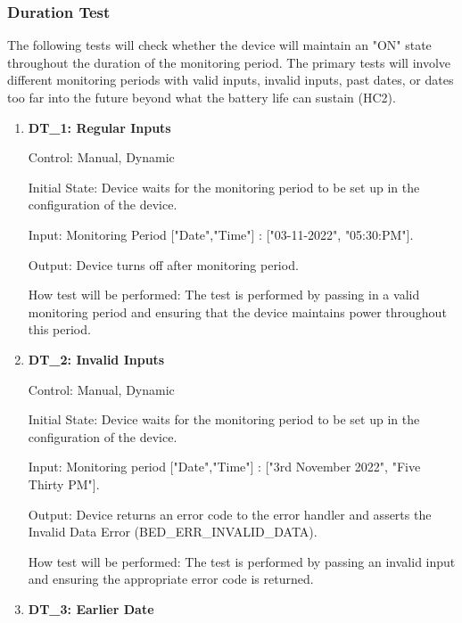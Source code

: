 \documentclass[12pt, titlepage]{article}
\begin{document}
\subsubsection{Duration Test}

The following tests will check whether the device will maintain an "ON" state throughout the duration of the monitoring period. The primary tests will involve different monitoring periods with valid inputs, invalid inputs, past dates, or dates too far into the future beyond what the battery life can sustain (HC2).
		
\begin{enumerate}

	\item{\textbf{DT\_1: Regular Inputs}\\}\label{DT1}
		
		Control: Manual, Dynamic
							
		Initial State: Device waits for the monitoring period to be set up in the configuration of the device.
							
		Input: Monitoring Period ["Date","Time"]  : ["03-11-2022", "05:30:PM"].
		
		Output: Device turns off after monitoring period.
							
		How test will be performed: The test is performed by passing in a valid monitoring period and ensuring that the device maintains power throughout this period.
					
	\item{\textbf{DT\_2: Invalid Inputs}\\}\label{DT2}
	
		Control: Manual, Dynamic
							
		Initial State: Device waits for the monitoring period to be set up in the configuration of the device.
							
		Input: Monitoring period ["Date","Time"] : ["3rd November 2022", "Five Thirty PM"].
							
		Output: Device returns an error code to the error handler and asserts the Invalid Data Error (BED\_ERR\_INVALID\_DATA).
		
		How test will be performed: The test is performed by passing an invalid input and ensuring the appropriate error code is returned.

\newpage
	\item{\textbf{DT\_3: Earlier Date}\\}\label{DT3}
		

\end{enumerate}
\end{document}
